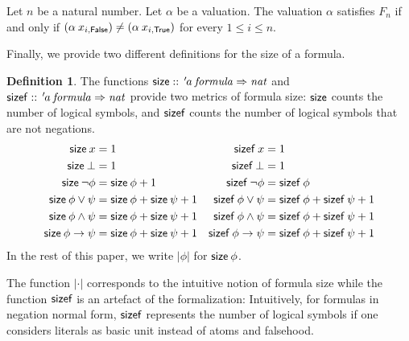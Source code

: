 \documentclass[a4paper,USenglish,cleveref, autoref, thm-restate]{lipics-v2021}
\theoremstyle{definition}
\newtheorem{definitionx}[theorem]{Definition}
\begin{document}
\begin{lemma}
  \label{thm_semantics_Fn_iff}
  Let $n$ be a natural number.
  Let $\alpha$ be a valuation.
  The valuation $\alpha$ satisfies $F_n$ if and only if $(\alpha \> x_{i,\mathsf{False}}) \neq (\alpha \> x_{i,\mathsf{True}})$ for every $1 \le i \le n$.
\end{lemma}

Finally, we provide two different definitions for the size of a formula.

\begin{definitionx}
  \label{def_size_sizef}
  The functions $\mathsf{size} \mathrel{::} {\thinspace'}{\kern-.175ex a} \> \mathit{formula} \Rightarrow \mathit{nat}$ and $\mathsf{sizef} \mathrel{::} {\thinspace'}{\kern-.175ex a} \> \mathit{formula} \Rightarrow \mathit{nat}$ provide two metrics of formula size:
  $\mathsf{size}$ counts the number of logical symbols, and
  $\mathsf{sizef}$ counts the number of logical symbols that are not negations.
  \begin{align*}
    \mathsf{size} \> x =\; & 1 &
    \mathsf{sizef} \> x =\; & 1 \\
    \mathsf{size} \> \bot =\; & 1 &
    \mathsf{sizef} \> \bot =\; & 1 \\
    \mathsf{size} \> \neg\phi =\; & \mathsf{size} \> \phi + 1 &
    \mathsf{sizef} \> \neg\phi =\; & \mathsf{sizef} \> \phi \\
    \mathsf{size} \> \phi \lor \psi =\; & \mathsf{size} \> \phi + \mathsf{size} \> \psi + 1 &
    \mathsf{sizef} \> \phi \lor \psi =\; & \mathsf{sizef} \> \phi + \mathsf{sizef} \> \psi + 1 \\
    \mathsf{size} \> \phi \land \psi =\; & \mathsf{size} \> \phi + \mathsf{size} \> \psi + 1 &
    \mathsf{sizef} \> \phi \land \psi =\; & \mathsf{sizef} \> \phi + \mathsf{sizef} \> \psi + 1 \\
    \mathsf{size} \> \phi \rightarrow \psi =\; & \mathsf{size} \> \phi + \mathsf{size} \> \psi + 1 &
    \mathsf{sizef} \> \phi \rightarrow \psi =\; & \mathsf{sizef} \> \phi + \mathsf{sizef} \> \psi + 1 \\
  \end{align*}
  In the rest of this paper, we write $|\phi|$ for $\mathsf{size} \> \phi$.
\end{definitionx}

The function $\left|\cdot\right|$ corresponds to the intuitive notion of formula size while the function $\mathsf{sizef}$ is an artefact of the formalization:
Intuitively, for formulas in negation normal form, $\mathsf{sizef}$ represents the number of logical symbols if one considers literals as basic unit instead of atoms and falsehood.
\end{document}
